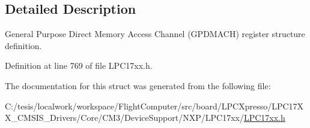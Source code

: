 \subsection{\-Detailed \-Description}
\-General \-Purpose \-Direct \-Memory \-Access \-Channel (\-G\-P\-D\-M\-A\-C\-H) register structure definition. 

\-Definition at line 769 of file \-L\-P\-C17xx.\-h.



\-The documentation for this struct was generated from the following file\-:\begin{DoxyCompactItemize}
\item 
\-C\-:/tesis/localwork/workspace/\-Flight\-Computer/src/board/\-L\-P\-C\-Xpresso/\-L\-P\-C17\-X\-X\-\_\-\-C\-M\-S\-I\-S\-\_\-\-Drivers/\-Core/\-C\-M3/\-Device\-Support/\-N\-X\-P/\-L\-P\-C17xx/\hyperlink{_l_p_c17xx_8h}{\-L\-P\-C17xx.\-h}\end{DoxyCompactItemize}
